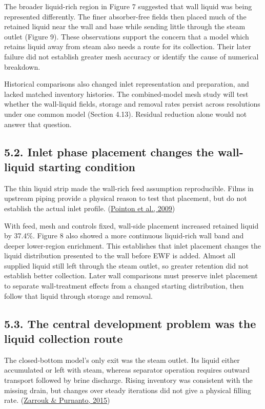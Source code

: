 \documentclass[
  12pt,
  a4paper,
]{article}
\begin{document}
The broader liquid-rich region in Figure 7 suggested that wall liquid
was being represented differently. The finer absorber-free fields then
placed much of the retained liquid near the wall and base while sending
little through the steam outlet (Figure 9). These observations support
the concern that a model which retains liquid away from steam also needs
a route for its collection. Their later failure did not establish
greater mesh accuracy or identify the cause of numerical breakdown.

Historical comparisons also changed inlet representation and
preparation, and lacked matched inventory histories. The combined-model
mesh study will test whether the wall-liquid fields, storage and removal
rates persist across resolutions under one common model (Section 4.13).
Residual reduction alone would not answer that question.

\subsection{5.2. Inlet phase placement changes the wall-liquid starting
condition}\label{inlet-phase-placement-changes-the-wall-liquid-starting-condition}

The thin liquid strip made the wall-rich feed assumption reproducible.
Films in upstream piping provide a physical reason to test that
placement, but do not establish the actual inlet profile.
(\href{https://publications.mygeoenergynow.org/grc/1028587.pdf}{Pointon
et al., 2009})

With feed, mesh and controls fixed, wall-side placement increased
retained liquid by 37.4\%. Figure 8 also showed a more continuous
liquid-rich wall band and deeper lower-region enrichment. This
establishes that inlet placement changes the liquid distribution
presented to the wall before EWF is added. Almost all supplied liquid
still left through the steam outlet, so greater retention did not
establish better collection. Later wall comparisons must preserve inlet
placement to separate wall-treatment effects from a changed starting
distribution, then follow that liquid through storage and removal.

\subsection{5.3. The central development problem was the liquid
collection
route}\label{the-central-development-problem-was-the-liquid-collection-route}

The closed-bottom model's only exit was the steam outlet. Its liquid
either accumulated or left with steam, whereas separator operation
requires outward transport followed by brine discharge. Rising inventory
was consistent with the missing drain, but changes over steady
iterations did not give a physical filling rate.
(\href{https://doi.org/10.1016/j.geothermics.2014.05.009}{Zarrouk \&
Purnanto, 2015})
\end{document}
